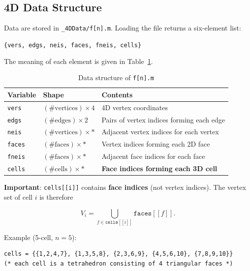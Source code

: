 \documentclass[12pt,a4paper]{article}
\theoremstyle{definition}
\begin{document}
\subsection{4D Data Structure}

Data are stored in \texttt{\_4DData/f[n].m}.
Loading the file returns a six-element list:

\begin{center}
\texttt{\{vers, edgs, neis, faces, fneis, cells\}}
\end{center}

\noindent
The meaning of each element is given in Table~\ref{tab:data}.

\begin{table}[h]
\centering
\caption{Data structure of \texttt{f[n].m}}
\label{tab:data}
\begin{tabular}{lll}
\toprule
Variable & Shape & Contents \\
\midrule
\texttt{vers}  & $(\text{\#vertices}) \times 4$ & 4D vertex coordinates \\
\texttt{edgs}  & $(\text{\#edges}) \times 2$    & Pairs of vertex indices forming each edge \\
\texttt{neis}  & $(\text{\#vertices}) \times *$ & Adjacent vertex indices for each vertex \\
\texttt{faces} & $(\text{\#faces}) \times *$    & Vertex indices forming each 2D face \\
\texttt{fneis} & $(\text{\#faces}) \times *$    & Adjacent face indices for each face \\
\texttt{cells} & $(\text{\#cells}) \times *$    & \textbf{Face indices forming each 3D cell} \\
\bottomrule
\end{tabular}
\end{table}

\noindent
\textbf{Important}: \texttt{cells[[i]]} contains \textbf{face indices}
(not vertex indices).
The vertex set of cell $i$ is therefore

\begin{equation}
  V_i = \bigcup_{f \in \texttt{cells}[[i]]} \texttt{faces}[[f]].
\end{equation}

Example (5-cell, $n=5$):
\begin{lstlisting}
cells = {{1,2,4,7}, {1,3,5,8}, {2,3,6,9}, {4,5,6,10}, {7,8,9,10}}
(* each cell is a tetrahedron consisting of 4 triangular faces *)
\end{lstlisting}
\end{document}
